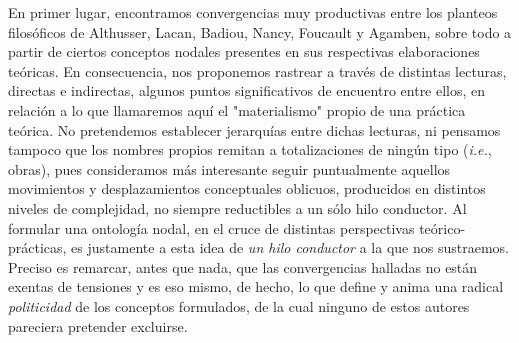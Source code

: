 \documentclass{book}
\begin{document}
En primer lugar, encontramos convergencias muy productivas entre los
planteos filosóficos de Althusser, Lacan, Badiou, Nancy, Foucault y
Agamben, sobre todo a partir de ciertos conceptos nodales presentes en
sus respectivas elaboraciones teóricas. En consecuencia, nos proponemos
rastrear a través de distintas lecturas, directas e indirectas, algunos
puntos significativos de encuentro entre ellos, en relación a lo que
llamaremos aquí el "materialismo" propio de una práctica teórica. No
pretendemos establecer jerarquías entre dichas lecturas, ni pensamos
tampoco que los nombres propios remitan a totalizaciones de ningún tipo
(\emph{i.e.}, obras), pues consideramos más interesante seguir
puntualmente aquellos movimientos y desplazamientos conceptuales
oblicuos, producidos en distintos niveles de complejidad, no siempre
reductibles a un sólo hilo conductor. Al formular una ontología nodal,
en el cruce de distintas perspectivas teórico-prácticas, es justamente a
esta idea de \emph{un hilo conductor} a la que nos sustraemos. Preciso
es remarcar, antes que nada, que las convergencias halladas no están
exentas de tensiones y es eso mismo, de hecho, lo que define y anima una
radical \emph{politicidad} de los conceptos formulados, de la cual
ninguno de estos autores pareciera pretender excluirse.
\end{document}
